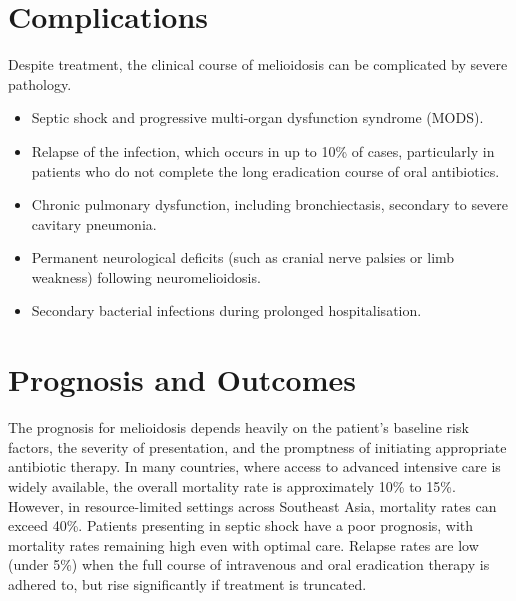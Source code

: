 \section*{Complications}
Despite treatment, the clinical course of melioidosis can be complicated by severe pathology.
\begin{itemize}
    \item Septic shock and progressive multi-organ dysfunction syndrome (MODS).
    \item Relapse of the infection, which occurs in up to 10\% of cases, particularly in patients who do not complete the long eradication course of oral antibiotics.
    \item Chronic pulmonary dysfunction, including bronchiectasis, secondary to severe cavitary pneumonia.
    \item Permanent neurological deficits (such as cranial nerve palsies or limb weakness) following neuromelioidosis.
    \item Secondary bacterial infections during prolonged hospitalisation.
\end{itemize}

\section*{Prognosis and Outcomes}
The prognosis for melioidosis depends heavily on the patient's baseline risk factors, the severity of presentation, and the promptness of initiating appropriate antibiotic therapy. In many countries, where access to advanced intensive care is widely available, the overall mortality rate is approximately 10\% to 15\%. However, in resource-limited settings across Southeast Asia, mortality rates can exceed 40\%. Patients presenting in septic shock have a poor prognosis, with mortality rates remaining high even with optimal care. Relapse rates are low (under 5\%) when the full course of intravenous and oral eradication therapy is adhered to, but rise significantly if treatment is truncated.

